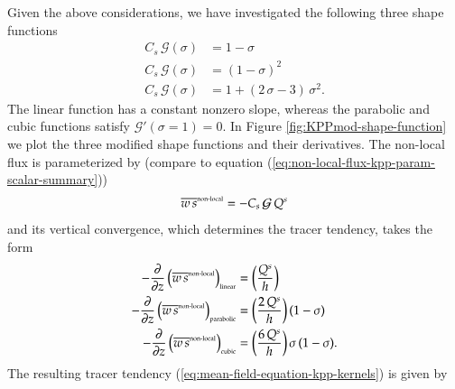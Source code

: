 Given the above considerations, we have investigated the following
three shape functions
\begin{subequations}
\begin{align}
 C_{s} \,  \mathcal{G}(\sigma) &= 1 - \sigma 
\label{eq:non-local-shape-function-linear}
 \\
 C_{s} \,  \mathcal{G}(\sigma) &= (1 - \sigma)^{2}
\label{eq:non-local-shape-function-parabolic}
 \\
 C_{s} \,  \mathcal{G}(\sigma) &= 1 + (2 \, \sigma  - 3) \, \sigma^{2}.
\label{eq:non-local-shape-function-cubic}
\end{align}
\end{subequations}
The linear function has a constant nonzero slope, whereas the
parabolic and cubic functions satisfy $\mathcal{G}'(\sigma = 1) = 0$.
In Figure \ref{fig:KPPmod-shape-function} we plot the three
modified shape functions and their derivatives.  The non-local flux is
parameterized by (compare to equation
(\ref{eq:non-local-flux-kpp-param-scalar-summary}))
\begin{equation}
 \overline{w \, s}^{\mbox{\tiny non-local}} = - C_{s} \, \mathcal{G} \, Q^{s} 
\label{eq:non-local-flux-kpp-param-scalar-new-form}
\end{equation}
and its vertical convergence, which determines the tracer tendency,
takes the form
\begin{subequations}
\begin{align}
 -\frac{\partial}{\partial z} \left( \overline{w \, s}^{\mbox{\tiny non-local}} \right)_{\mbox{\tiny linear}} 
 &= \left( \frac{Q^{s}}{h} \right)
 \\
-\frac{\partial}{\partial z} \left( \overline{w \, s}^{\mbox{\tiny non-local}} \right)_{\mbox{\tiny parabolic}} 
 &= \left( \frac{2 \, Q^{s}}{h} \right) (1-\sigma)
 \\
-\frac{\partial}{\partial z} \left( \overline{w \, s}^{\mbox{\tiny non-local}} \right)_{\mbox{\tiny cubic}} 
 &= \left( \frac{6 \, Q^{s}}{h} \right) \sigma \, (1-\sigma).
\end{align}
\end{subequations}
The resulting tracer tendency
(\ref{eq:mean-field-equation-kpp-kernels}) is given by 
